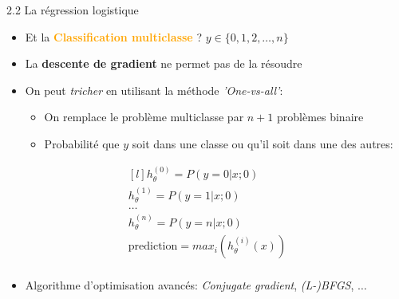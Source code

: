 \begin{frame}{2.2 La régression logistique}
  \begin{itemize}
  \item Et la \textcolor{orange}{\textbf{Classification multiclasse}} ? $y \in \{0,1,2,\dots,n\}$
  \item La \textbf{descente de gradient} ne permet pas de la résoudre
  \item On peut \textit{tricher} en utilisant la méthode \textit{'One-vs-all'}:
    \begin{itemize}
    \item On remplace le problème multiclasse par $n+1$ problèmes binaire
    \item Probabilité que $y$ soit dans une classe ou qu'il soit dans une des autres:
    \end{itemize}
  \end{itemize}
  \begin{equation*}
    \begin{matrix*}[l]
      h_{\theta}^{(0)} = P(y=0 | x;0)\\
      h_{\theta}^{(1)} = P(y=1 | x;0)\\
      \dots \\
      h_{\theta}^{(n)} = P(y=n | x;0)\\
      \text{prediction} = max_{i}(h_{\theta}^{(i)}(x))\\
    \end{matrix*}
  \end{equation*}
  \begin{itemize}
  \item Algorithme d'optimisation avancés: \textit{Conjugate gradient}, \textit{(L-)BFGS}, $\dots$
  \end{itemize}
\end{frame}

